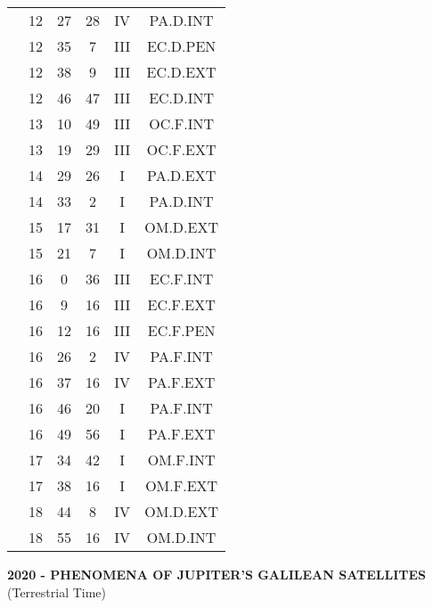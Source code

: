 \documentclass[12pt, a4paper]{article}
\begin{document}
\begin{multicols}{3}
{\begin{tabular}{c c c c c c}
	 	 	 	 & 12 & 27 & 28 & IV & PA.D.INT\\%
	 	 	 	 & 12 & 35 & 7 & III & EC.D.PEN\\%
	 	 	 	 & 12 & 38 & 9 & III & EC.D.EXT\\%
	 	 	 	 & 12 & 46 & 47 & III & EC.D.INT\\%
	 	 	 	 & 13 & 10 & 49 & III & OC.F.INT\\%
	 	 	 	 & 13 & 19 & 29 & III & OC.F.EXT\\%
	 	 	 	 & 14 & 29 & 26 & I & PA.D.EXT\\%
	 	 	 	 & 14 & 33 & 2 & I & PA.D.INT\\%
	 	 	 	 & 15 & 17 & 31 & I & OM.D.EXT\\%
	 	 	 	 & 15 & 21 & 7 & I & OM.D.INT\\%
	 	 	 	 & 16 & 0 & 36 & III & EC.F.INT\\%
	 	 	 	 & 16 & 9 & 16 & III & EC.F.EXT\\%
	 	 	 	 & 16 & 12 & 16 & III & EC.F.PEN\\%
	 	 	 	 & 16 & 26 & 2 & IV & PA.F.INT\\%
	 	 	 	 & 16 & 37 & 16 & IV & PA.F.EXT\\%
	 	 	 	 & 16 & 46 & 20 & I & PA.F.INT\\%
	 	 	 	 & 16 & 49 & 56 & I & PA.F.EXT\\%
	 	 	 	 & 17 & 34 & 42 & I & OM.F.INT\\%
	 	 	 	 & 17 & 38 & 16 & I & OM.F.EXT\\%
	 	 	 	 & 18 & 44 & 8 & IV & OM.D.EXT\\%
	 	 	 	 & 18 & 55 & 16 & IV & OM.D.INT\\%
	 	 \end{tabular}
 	}
\end{multicols}
\pagebreak
\textbf{2020 - PHENOMENA OF JUPITER'S GALILEAN SATELLITES}\\(Terrestrial Time) 
\end{document}
